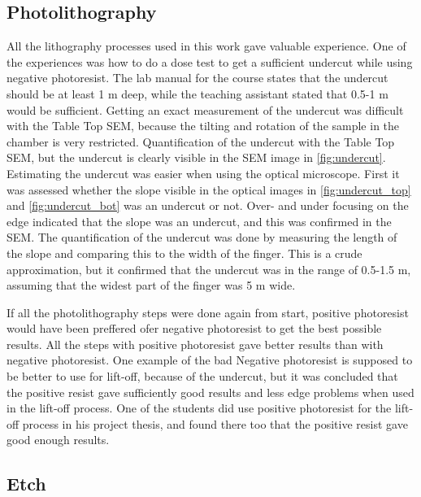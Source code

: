 
\subsection{Photolithography}
\label{sec:discussion:photolithography}

All the lithography processes used in this work gave valuable experience.
One of the experiences was how to do a dose test to get a sufficient undercut while using negative photoresist. 
The lab manual for the course \cite{labmanual} states that the undercut should be at least 1 \textmu m deep, while the teaching assistant stated that 0.5-1 \textmu m would be sufficient.
Getting an exact measurement of the undercut was difficult with the Table Top SEM, because the tilting and rotation of the sample in the chamber is very restricted. 
Quantification of the undercut with the Table Top SEM, but the undercut is clearly visible in the SEM image in \autoref{fig:undercut}.
Estimating the undercut was easier when using the optical microscope. 
First it was assessed whether the slope visible in the optical images in \autoref{fig:undercut_top} and \autoref{fig:undercut_bot} was an undercut or not.
Over- and under focusing on the edge indicated that the slope was an undercut, and this was confirmed in the SEM. 
The quantification of the undercut was done by measuring the length of the slope and comparing this to the width of the finger. 
This is a crude approximation, but it confirmed that the undercut was in the range of 0.5-1.5 \textmu m, assuming that the widest part of the finger was 5 \textmu m wide.


If all the photolithography steps were done again from start,  positive photoresist would have been preffered ofer negative photoresist to get the best possible results.
All the steps with positive photoresist gave better results than with negative photoresist.
One example of the bad
Negative photoresist is supposed to be better to use for lift-off, because of the undercut, but it was concluded that the positive resist gave sufficiently good results and less edge problems when used in the lift-off process.
One of the students did use positive photoresist for the lift-off process in his project thesis, and found there too that the positive resist gave good enough results.


\subsection{Etch}
\label{sec:discussion:etch}

